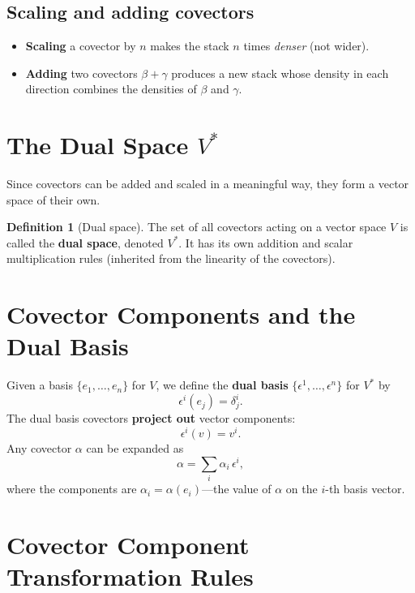 \documentclass[12pt, a4paper]{report}
\theoremstyle{definition}
\newtheorem{definition}{Definition}[chapter]
\theoremstyle{plain}
\theoremstyle{remark}
\begin{document}
\subsection*{Scaling and adding covectors}

\begin{itemize}[nosep]
    \item \textbf{Scaling} a covector by $n$ makes the stack $n$ times \emph{denser}
          (not wider).
    \item \textbf{Adding} two covectors $\beta + \gamma$ produces a new stack whose
          density in each direction combines the densities of $\beta$ and $\gamma$.
\end{itemize}

\section{The Dual Space $V^*$}

Since covectors can be added and scaled in a meaningful way, they form a vector
space of their own.

\begin{definition}[Dual space]
The set of all covectors acting on a vector space $V$ is called the
\textbf{dual space}, denoted $V^{*}$.  It has its own addition and scalar
multiplication rules (inherited from the linearity of the covectors).
\end{definition}

\section{Covector Components and the Dual Basis}\label{sec:dual-basis}

Given a basis $\{e_1, \dots, e_n\}$ for $V$, we define the \textbf{dual basis}
$\{\epsilon^1, \dots, \epsilon^n\}$ for $V^*$ by
\begin{equation}\label{eq:dual-basis-def}
    \boxed{\epsilon^{i}(e_j) = \delta^{i}_{j}.}
\end{equation}
The dual basis covectors \textbf{project out} vector components:
\[
    \epsilon^{i}(v) = v^{i}.
\]
Any covector $\alpha$ can be expanded as
\[
    \alpha = \sum_{i} \alpha_i\, \epsilon^{i},
\]
where the components are $\alpha_i = \alpha(e_i)$---the value of $\alpha$ on the
$i$-th basis vector.

\section{Covector Component Transformation Rules}
\end{document}
